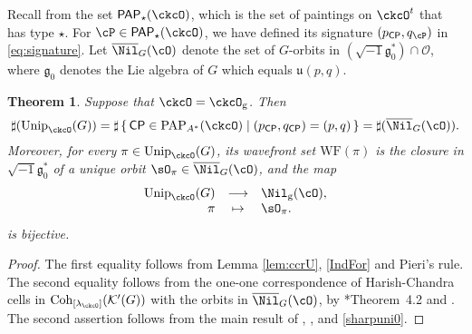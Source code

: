 \documentclass[12pt,a4paper]{amsart}
\newcommand{\WF}{\mathrm{WF}}
\def\Im{\operatorname{Im}}
\newcommand{\CK}{{\mathcal {K}}}
\newcommand{\CO}{{\mathcal {O}}}
\newcommand{\CP}{{\mathcal {P}}}
\newcommand{\g}{\mathfrak g}
\renewcommand{\u}{\mathfrak u}
\newcommand{\be}{\begin {equation}}
\newcommand{\ee}{\end {equation}}
\numberwithin{equation}{section}
\newtheorem{thm}{Theorem}[section]
\theoremstyle{remark}
\def\Unip{\mathrm{Unip}}
\def\CP{\mathsf{CP}}
\def\Cint#1{\Coh_{[#1]}}
\def\PP{\mathsf{PAP}}
\def\Im{\mathrm{Im}}
\def\Coh{\mathrm{Coh}}
\begin{document}
Recall from  the set $\PP_{\star}(\ckcO)$, which is the set of paintings on $\ckcO^{t}$ that has type $\star$.
For $\cP \in \PP_{\star}(\ckcO)$, we have defined its signature $(p_\CP, q_\cP)$ in \eqref{eq:signature}. Let $\overline \Nil_{G}(\cO)$ denote the set of $G$-orbits in $(\sqrt{-1}\g_0^*)\cap \CO$, where $\g_0$ denotes the Lie algebra of $G$ which equals $\u(p,q)$.  

\begin{thm} Suppose that $\ckcO = \ckcO_{\mathrm g}$.
Then
\be\label{sharpuni0}
    \sharp(\Unip_{\ckcO}(G))= \sharp \set{\CP\in \mathrm{PAP}_{A^*}(\ckcO)|(p_\CP, q_\CP)=(p,q)}=\sharp(\overline \Nil_{G}(\cO)).
  \ee
Moreover, for every $\pi\in \Unip_{\ckcO}(G)$, its wavefront set $\WF(\pi)$ is the closure in   $\sqrt{-1}\g_0^*$ of a unique orbit $\sO_\pi\in \overline \Nil_{G}(\cO)$, and the map 
\[
  \begin{array}{rcl}
  \Unip_{\ckcO}(G) &\longrightarrow& \Nil_{\mathrm g}(\cO),\\
  \pi & \mapsto & \sO_\pi.
  \end{array}
\]
 is bijective.

\end{thm}

\begin{proof} The first equality follows from Lemma \ref{lem:ccrU}, \eqref{IndFor} and Pieri's rule. The second equality follows from the one-one
correspondence of Harish-Chandra cells in $\Cint{\lambda_\ckcO}(\CK'(G))$ with the  orbits in  $\overline \Nil_{G}(\cO)$, by \cite{BV.W}*{Theorem~4.2} and \cite[Theorem 5]{Bo}.
The second assertion follows from the main result of \cite{SV}, \cite[Theorem 5]{Bo}, and \eqref{sharpuni0}.
\end{proof}
\end{document}
